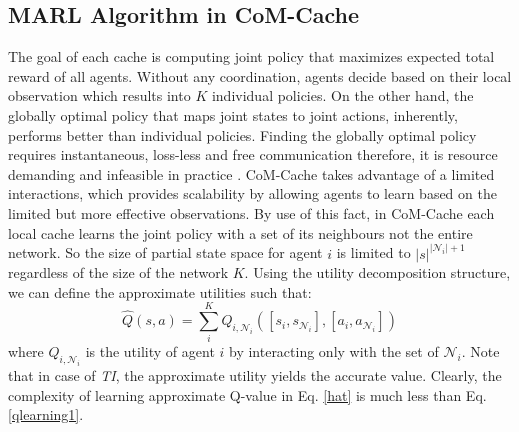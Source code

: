\documentclass[journal,onecolumn]{IEEEtran}
\begin{document}






\subsection{MARL Algorithm in CoM-Cache }
\label{XX}
The goal of each cache is computing joint policy that maximizes expected total reward of all agents. Without any coordination, agents decide based on their local observation which results into $K$ individual policies. On the other hand, the globally optimal policy that maps joint states to joint actions, inherently, performs better than individual policies. %
Finding the globally optimal policy requires instantaneous, loss-less and free communication therefore, it is resource demanding and infeasible in practice \cite{bernstein2002complexity}. 
CoM-Cache takes advantage of a limited interactions, which provides scalability by allowing agents to learn based on the limited but more effective observations. 
By use of this fact, in CoM-Cache each local cache learns the joint policy with a set of its neighbours not the entire network. So the size of partial state space for agent $i$ is limited to $|s|^{|\mathcal{N}_i|+1}$ regardless of the size of the network $K$. 
Using the utility decomposition structure, we can define the approximate utilities such that:
\begin{equation}
\label{hat}
\hat{Q}(s,a) = \sum_i^K Q_{i,\mathcal{N}_i} ([s_i,s_{\mathcal{N}_i}],[a_i,a_{\mathcal{N}_i}])
\end{equation}
where $Q_{i,\mathcal{N}_i}$ is the utility of agent $i$ by interacting only with the set of $\mathcal{N}_i$. Note that in case of \textit{TI}, the approximate utility yields the accurate value. Clearly, the complexity of learning approximate Q-value in Eq. \ref{hat} is much less than Eq. \ref{qlearning1}.
\end{document}
